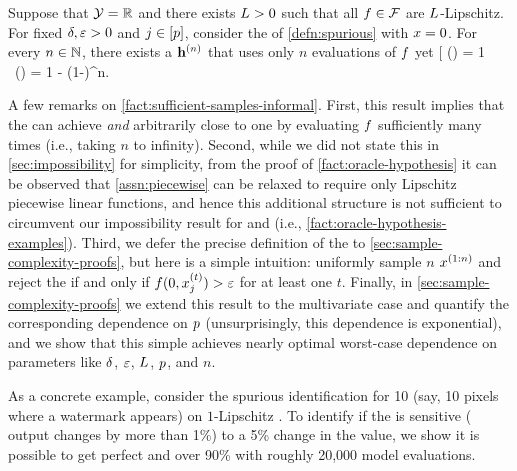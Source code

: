 \begin{theorem}\label{fact:sufficient-samples-informal}
Suppose that $\mathcal{Y}=\mathbb{R}$ and there exists $L>0$ such that all $f\in\mathcal{F}$ are $L$-Lipschitz. 
For fixed $\delta,\varepsilon>0$ and $j\in[p]$, consider the \downtaskname{} of \cref{defn:spurious} with $x=0$.
%
%
%
%
%
For every $n\in\mathbb{N}$, there exists a \hyptestname{} $\mathbf{h}^{(n)}$ that uses only $n$ evaluations of $f$ yet
\*[
    \specsym(\oraclehyptest{}) = 1
    \  \
    \senssym(\oraclehyptest{})
    = 1 - \Big(1-\frac{2\outscale}{\lipconst\inscale}\Big)^n.
\]
\end{theorem}

A few remarks on \cref{fact:sufficient-samples-informal}. 
%
First, this result implies that the \username{} can achieve \specname{} \emph{and} \sensname{} arbitrarily close to one by evaluating $f$ sufficiently many times (i.e., taking $n$ to infinity).
Second, while we did not state this in \cref{sec:impossibility} for simplicity, from the proof of \cref{fact:oracle-hypothesis} it can be observed that \cref{assn:piecewise} can be relaxed to require only Lipschitz piecewise linear functions, and hence this additional structure is not sufficient to circumvent our impossibility result for \completename{} and \additivename{} \fielddefnames{} (i.e., \cref{fact:oracle-hypothesis-examples}). 
Third, we defer the precise definition of the \hyptestname{} to \cref{sec:sample-complexity-proofs}, but here is a simple intuition: uniformly sample $n$ \obsnames{} $x^{(1:n)}$ and reject the \nullname{} if and only if $f(0,x_{j}^{(t)}) > \varepsilon$ for at least one $t$.
Finally, in \cref{sec:sample-complexity-proofs} we extend this result to the multivariate case and quantify the corresponding dependence on $p$ (unsurprisingly, this dependence is exponential), and we show that this simple \hyptestname{} achieves nearly optimal worst-case dependence on parameters like $\delta$, $\varepsilon$, $L$, $p$, and $n$. 

As a concrete example, consider the spurious \covname{} identification \downtaskname{} for 10 \covnames{} (say, 10 pixels where a watermark appears) on $1$-Lipschitz \modelnames{}.
To identify if the \modelname{} is sensitive (\modelname{} output changes by more than 1\%) to a 5\% change in the \covname{} value, we show it is possible to get perfect \specname{} and over 90\% \sensname{} with roughly 20,000 model evaluations. 
%
%
%
 
